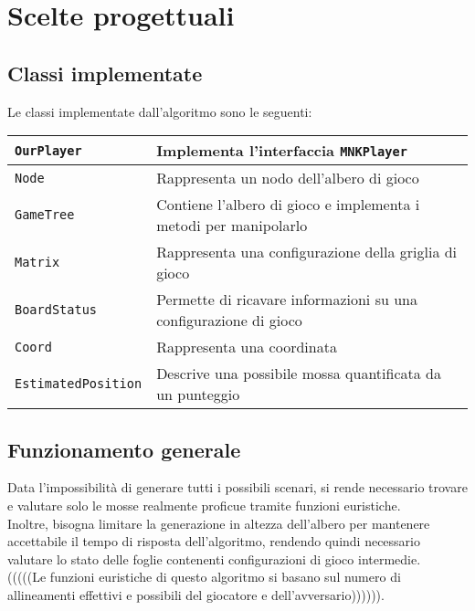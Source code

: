 \documentclass[11pt]{article}
\begin{document}
\section*{Scelte progettuali}
\subsection*{Classi implementate}
Le classi implementate dall'algoritmo sono le seguenti:
\begin{table}[H]	%
\centering			%
\def\arraystretch{1.5}
\begin{tabular}{|l|p{4in}|}	%
\hline	%
\texttt{OurPlayer} & Implementa l'interfaccia \texttt{MNKPlayer} \\ \hline
\texttt{Node} & Rappresenta un nodo dell'albero di gioco \\ \hline
\texttt{GameTree} & Contiene l'albero di gioco e implementa i metodi per manipolarlo \\ \hline
\texttt{Matrix} & Rappresenta una configurazione della griglia di gioco \\ \hline
\texttt{BoardStatus} & Permette di ricavare informazioni su una configurazione di gioco \\ \hline
\texttt{Coord} & Rappresenta una coordinata \\ \hline
\texttt{EstimatedPosition} & Descrive una possibile mossa quantificata da un punteggio \\ \hline
\end{tabular}
\end{table}

\subsection*{Funzionamento generale}
Data l'impossibilità di generare tutti i possibili scenari, si rende necessario trovare e valutare solo le mosse realmente proficue tramite funzioni euristiche.\\
Inoltre, bisogna limitare la generazione in altezza dell'albero per mantenere accettabile il tempo di risposta dell'algoritmo, rendendo quindi necessario valutare lo stato delle foglie contenenti configurazioni di gioco intermedie.\\
(((((Le funzioni euristiche di questo algoritmo si basano sul numero di allineamenti effettivi e possibili del giocatore e dell'avversario)))))).
\end{document}
